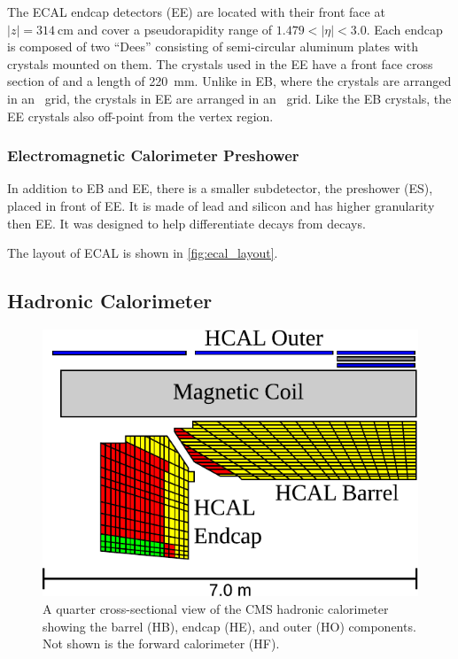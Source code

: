 The ECAL endcap detectors (EE) are located with their front face at
$|z|=\SI{314}{\centi\meter}$ and cover a pseudorapidity range of $1.479 <
|\eta| < 3.0$. Each endcap is composed of two ``Dees'' consisting of
semi-circular aluminum plates with crystals mounted on them. The crystals used
in the EE have a front face cross section of
 and a length of
\SI{220}{\milli\meter}. Unlike in EB, where the crystals are arranged in an
\coordetaphi~grid, the crystals in EE are arranged in an \coordxy~grid. Like
the EB crystals, the EE crystals also off-point from the vertex region.

\subsubsection{Electromagnetic Calorimeter Preshower}

In addition to EB and EE, there is a smaller subdetector, the preshower (ES),
placed in front of EE. It is made of lead and silicon and has higher
granularity then EE. It was designed to help differentiate \pitogammagamma
decays from \higgstogammagamma decays.

The layout of ECAL is shown in \cref{fig:ecal_layout}.

\subsection{Hadronic Calorimeter}
\label{ssec:hcal}

\begin{figure}[!htbp]
    \centering
    \includegraphics[width=\textwidth]{figures/hcal_cross_section.pdf}
    \caption[
        A quarter cross-sectional view of the CMS hadronic calorimeter.
    ]{
        A quarter cross-sectional view of the CMS hadronic calorimeter showing
        the barrel (HB), endcap (HE), and outer (HO) components. Not shown is
        the forward calorimeter (HF).
    }
    \label{fig:hcal_layout}
\end{figure}

